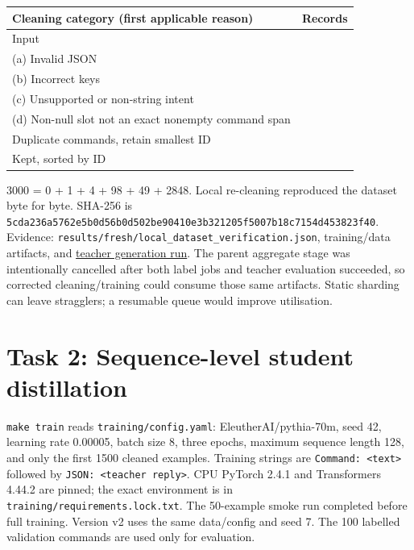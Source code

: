 \documentclass[10pt,a4paper]{article}
\begin{document}
\begin{center}\small\begin{tabularx}{\linewidth}{@{}>{\raggedright\arraybackslash}X>{\raggedright\arraybackslash}X@{}}\toprule

\textbf{Cleaning category (first applicable reason)} & \textbf{Records} \\ \midrule

Input & 3000 \\

(a) Invalid JSON & 0 \\

(b) Incorrect keys & 1 \\

(c) Unsupported or non-string intent & 4 \\

(d) Non-null slot not an exact nonempty command span & 98 \\

Duplicate commands, retain smallest ID & 49 \\

Kept, sorted by ID & 2848 \\

\bottomrule\end{tabularx}\end{center}

3000 = 0 + 1 + 4 + 98 + 49 + 2848. Local re-cleaning reproduced the dataset byte for byte. SHA-256 is \texttt{5cda236a5762e5b0d56b0d502be90410e3b321205f5007b18c7154d453823f40}. Evidence: \texttt{results/\allowbreak{}fresh/\allowbreak{}local\_\allowbreak{}dataset\_\allowbreak{}verification.json}, training/data artifacts, and \href{https://github.com/lokesh1-cell/cloud-assignmnet/actions/runs/42475264293}{teacher generation run}. The parent aggregate stage was intentionally cancelled after both label jobs and teacher evaluation succeeded, so corrected cleaning/training could consume those same artifacts. Static sharding can leave stragglers; a resumable queue would improve utilisation.


\section{Task 2: Sequence-level student distillation}

\texttt{make train} reads \texttt{training/\allowbreak{}config.yaml}: EleutherAI/pythia-70m, seed 42, learning rate 0.00005, batch size 8, three epochs, maximum sequence length 128, and only the first 1500 cleaned examples. Training strings are \texttt{Command: \textless{}text\textgreater{}} followed by \texttt{JSON: \textless{}teacher reply\textgreater{}}. CPU PyTorch 2.4.1 and Transformers 4.44.2 are pinned; the exact environment is in \texttt{training/\allowbreak{}requirements.lock.txt}. The 50-example smoke run completed before full training. Version v2 uses the same data/config and seed 7. The 100 labelled validation commands are used only for evaluation.
\end{document}
